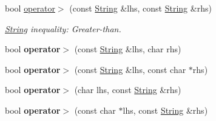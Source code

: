 {\bf }\par
\begin{DoxyCompactItemize}
\item 
bool \hyperlink{classString_a1d1bcc50e73c2538ca16f3aec01eef87}{operator$>$} (const \hyperlink{classString}{String} \&lhs, const \hyperlink{classString}{String} \&rhs)
\begin{DoxyCompactList}\small\item\em \hyperlink{classString}{String} inequality\-: Greater-\/than. \end{DoxyCompactList}\item 
\hypertarget{classString_a566b1d31a6078ef4de4362be86e562e6}{bool {\bfseries operator$>$} (const \hyperlink{classString}{String} \&lhs, char rhs)}\label{classString_a566b1d31a6078ef4de4362be86e562e6}

\item 
\hypertarget{classString_ab4a443eed7b8adb78c5aadca1354b49b}{bool {\bfseries operator$>$} (const \hyperlink{classString}{String} \&lhs, const char $\ast$rhs)}\label{classString_ab4a443eed7b8adb78c5aadca1354b49b}

\item 
\hypertarget{classString_a486badb004de822729b2ed7acaf59870}{bool {\bfseries operator$>$} (char lhs, const \hyperlink{classString}{String} \&rhs)}\label{classString_a486badb004de822729b2ed7acaf59870}

\item 
\hypertarget{classString_a0ac76ec24bc20d38967c451767fa76bd}{bool {\bfseries operator$>$} (const char $\ast$lhs, const \hyperlink{classString}{String} \&rhs)}\label{classString_a0ac76ec24bc20d38967c451767fa76bd}

\end{DoxyCompactItemize}

